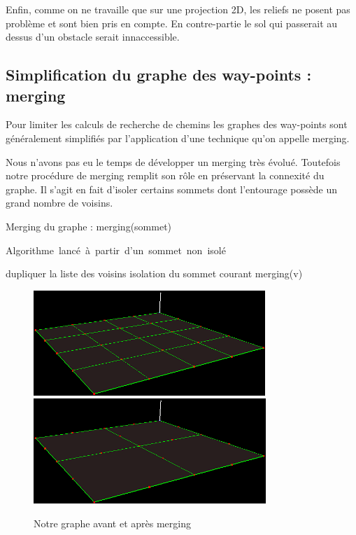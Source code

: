 \documentclass[a4paper,12pt]{report}
\begin{document}
Enfin, comme on ne travaille que sur une projection 2D, les reliefs ne posent pas problème et sont bien pris en compte. En contre-partie le sol qui passerait au dessus d'un obstacle serait innaccessible.

\subsection{Simplification du graphe des way-points : merging}

Pour limiter les calculs de recherche de chemins les graphes des way-points sont généralement simplifiés par l'application d'une technique qu'on appelle merging. 

Nous n'avons pas eu le temps de développer un merging très évolué. Toutefois notre procédure de merging remplit son rôle en préservant la connexité du graphe. Il s'agit en fait d'isoler certains sommets dont l'entourage possède un grand nombre de voisins. 

\begin{algorithm}[h]
\caption{Merging du graphe : merging(sommet)}
\label{merging_graphe}
\mbox{Algorithme lancé à partir d'un sommet non isolé}
\begin{algorithmic}[1]
  \STATE dupliquer la liste des voisins
      \STATE isolation du sommet courant
    \ENDIF
  \ENDIF
    \STATE merging(v)
  \ENDFOR
\ENDIF
\end{algorithmic}
\end{algorithm}

\begin{figure}[h]
\centering
\includegraphics[scale=0.6]{Images/maillage.png}
\includegraphics[scale=0.6]{Images/merging.png}
\caption{Notre graphe avant et après merging}
\end{figure}
\vspace{0.5cm}
\end{document}
